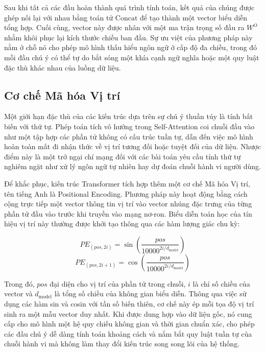 Sau khi tất cả các đầu hoàn thành quá trình tính toán, kết quả của chúng được ghép nối lại với nhau bằng toán tử $\text{Concat}$ để tạo thành một vector biểu diễn tổng hợp. Cuối cùng, vector này được nhân với một ma trận trọng số đầu ra $W^O$ nhằm khôi phục lại kích thước chiều ban đầu. Sự ưu việt của phương pháp này nằm ở chỗ nó cho phép mô hình thấu hiểu ngôn ngữ ở cấp độ đa chiều, trong đó mỗi đầu chú ý có thể tự do bắt sóng một khía cạnh ngữ nghĩa hoặc một quy luật đặc thù khác nhau của luồng dữ liệu.

\subsection{Cơ chế Mã hóa Vị trí}
\label{subsec:positional_encoding}
Một giới hạn đặc thù của các kiến trúc dựa trên sự chú ý thuần túy là tính bất biến với thứ tự. Phép toán tích vô hướng trong Self-Attention coi chuỗi đầu vào như một tập hợp các phần tử không có cấu trúc tuần tự, dẫn đến việc mô hình hoàn toàn mất đi nhận thức về vị trí tương đối hoặc tuyệt đối của dữ liệu. Nhược điểm này là một trở ngại chí mạng đối với các bài toán yêu cầu tính thứ tự nghiêm ngặt như xử lý ngôn ngữ tự nhiên hay dự đoán chuỗi hành vi người dùng.

Để khắc phục, kiến trúc Transformer tích hợp thêm một cơ chế Mã hóa Vị trí, tên tiếng Anh là Positional Encoding. Phương pháp này hoạt động bằng cách cộng trực tiếp một vector thông tin vị trí vào vector nhúng đặc trưng của từng phần tử đầu vào trước khi truyền vào mạng nơ-ron. Biểu diễn toán học của tín hiệu vị trí này thường được khởi tạo thông qua các hàm lượng giác chu kỳ:

\begin{equation}
    PE_{(pos, 2i)} = \sin\left(\frac{pos}{10000^{2i/d_{\text{model}}}}\right)
\end{equation}
\begin{equation}
    PE_{(pos, 2i+1)} = \cos\left(\frac{pos}{10000^{2i/d_{\text{model}}}}\right)
\end{equation}

Trong đó, $pos$ đại diện cho vị trí của phần tử trong chuỗi, $i$ là chỉ số chiều của vector và $d_{\text{model}}$ là tổng số chiều của không gian biểu diễn. Thông qua việc sử dụng các hàm sin và cosin với tần số biến thiên, cơ chế này ép mỗi tọa độ vị trí sinh ra một mẫu vector duy nhất. Khi được dung hợp vào dữ liệu gốc, nó cung cấp cho mô hình một hệ quy chiếu không gian và thời gian chuẩn xác, cho phép các đầu chú ý dễ dàng tính toán khoảng cách và nắm bắt quy luật tuần tự của chuỗi hành vi mà không làm thay đổi kiến trúc song song lõi của hệ thống.


